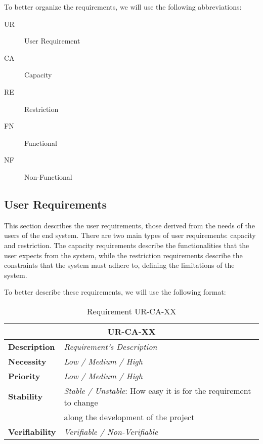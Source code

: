 To better organize the requirements, we will use the following abbreviations:

\begin{description}
    \item[UR]  User Requirement
    \item[CA]  Capacity
    \item[RE]  Restriction
    \item[FN]  Functional
    \item[NF]  Non-Functional
\end{description}

\subsection{User Requirements}
\label{sec:user-requirements}
This section describes the user requirements, those derived from the needs of the users of the end system. There are two main types of user requirements: capacity and restriction. The capacity requirements describe the functionalities that the user expects from the system, while the restriction requirements describe the constraints that the system must adhere to, defining the limitations of the system.

To better describe these requirements, we will use the following format:

\begin{table}[H]
    \centering
    \begin{tabular}{l p{10cm}}
        \toprule
        \multicolumn{2}{c}{UR-CA-XX} \\
        \toprule
        \textbf{Description}        & \textit{Requirement's Description} \\
        \textbf{Necessity}          & \textit{Low / Medium / High} \\
        \textbf{Priority}           & \textit{Low / Medium / High} \\
        \multirow{1}{*}{\textbf{Stability}} & \textit{Stable / Unstable}: How easy it is for the requirement to change \\
                                            & along the development of the project \\
        \textbf{Verifiability}       & \textit{Verifiable / Non-Verifiable} \\
    \end{tabular}
    \caption{Requirement UR-CA-XX}
\end{table}

